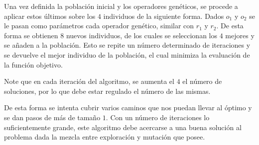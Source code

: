 \documentclass[a4paper,12pt]{book}
\begin{document}
		Una vez definida la población inicial y los operadores genéticos, se procede a aplicar estos últimos sobre los $4$ individuos de la siguiente forma. Dados $o_1$ y $o_2$ se le pasan como parámetros cada operador genético, similar con $r_1$ y $r_2$. De esta forma se obtienen $8$ nuevos individuos, de los cuales se seleccionan los $4$ mejores y se añaden a la población. Esto se repite un número determinado de iteraciones y se devuelve el mejor individuo de la población, el cual minimiza la evaluación de la función objetivo.
		
		Note que en cada iteración del algoritmo, se aumenta el $4$ el número de soluciones, por lo que debe estar regulado el número de las mismas.
	
		De esta forma se intenta cubrir varios caminos que nos puedan llevar al óptimo y se dan pasos de más de tamaño $1$. Con un número de iteraciones lo suficientemente grande, este algoritmo debe acercarse a una buena solución al problema dada la mezcla entre exploración y mutación que posee.
	
	



\end{document}
